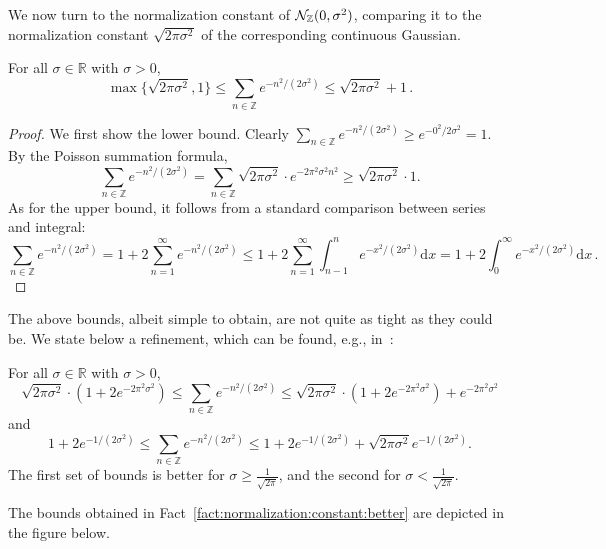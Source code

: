 \documentclass{jpcfinal} %
\newcommand{\dx}[1][x]{\mathrm{d}#1}
\newcommand{\Z}{\mathbb{Z}}
\newcommand{\R}{\mathbb{R}}
\begin{document}
We now turn to the normalization constant of $\discN(0,\sigma^2)$, comparing it to the normalization constant $\sqrt{2\pi\sigma^2}$ of the corresponding continuous Gaussian.
\begin{fact}\label{fact:normalization:constant}
    For all $\sigma \in \R$ with $\sigma>0$,
    \begin{equation}
        \max\{ \sqrt{2\pi\sigma^2} , 1\}
        \leq \sum_{n\in\Z} e^{-n^2/(2\sigma^2)} 
        \leq \sqrt{2\pi\sigma^2} + 1\,.
    \end{equation}
\end{fact}
\begin{proof}
We first show the lower bound. Clearly $\sum_{n\in\Z} e^{-n^2/(2\sigma^2)} \ge e^{-0^2/2\sigma^2}=1$. By the Poisson summation formula,
\[
        \sum_{n\in\Z} e^{-n^2/(2\sigma^2)} 
        = \sum_{n\in\Z} \sqrt{2\pi\sigma^2} \cdot e^{-2\pi^2\sigma^2n^2} 
        \geq \sqrt{2\pi\sigma^2} \cdot 1.
\]
As for the upper bound, it follows from a standard comparison between series and integral:
\[
        \sum_{n\in\Z} e^{-n^2/(2\sigma^2)} 
        = 1+ 2\sum_{n=1}^\infty e^{-n^2/(2\sigma^2)}
        \leq 1+ 2\sum_{n=1}^\infty \int_{n-1}^n e^{-x^2/(2\sigma^2)} \dx 
        = 1+ 2\int_{0}^\infty e^{-x^2/(2\sigma^2)} \dx\,. 
\]
\end{proof}
The above bounds, albeit simple to obtain, are not quite as tight as they could be. We state below a refinement, which can be found, e.g., in~\cite[Claim~2.8.1]{Stephens-Davidowitz17}:
\begin{fact}\label{fact:normalization:constant:better}
    For all $\sigma \in \R$ with $\sigma>0$,
    \begin{equation}
        \sqrt{2\pi\sigma^2} \cdot (1+2e^{-2\pi^2\sigma^2}) 
            \leq \sum_{n\in\Z} e^{-n^2/(2\sigma^2)} 
            \leq \sqrt{2\pi\sigma^2} \cdot (1+2e^{-2\pi^2\sigma^2}) + e^{-2\pi^2\sigma^2}
    \end{equation}
    and
    \begin{equation}
        1+2e^{-1/(2\sigma^2)}
            \leq \sum_{n\in\Z} e^{-n^2/(2\sigma^2)} 
            \leq 1+2e^{-1/(2\sigma^2)} + \sqrt{2\pi\sigma^2} e^{-1/(2\sigma^2)}.
    \end{equation}
    The first set of bounds is better for $\sigma \geq \frac{1}{\sqrt{2\pi}}$, and the second for $\sigma < \frac{1}{\sqrt{2\pi}}$.
\end{fact}
\noindent The bounds obtained in Fact~\ref{fact:normalization:constant:better} are depicted in the figure below.
\end{document}
